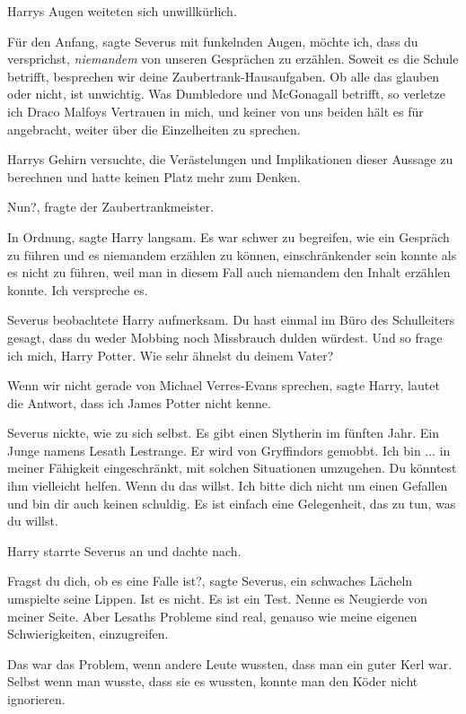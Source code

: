 Harrys Augen weiteten sich unwillkürlich.

\glqq{}Für den Anfang\grqq{}, sagte Severus mit funkelnden Augen, \glqq{}möchte
ich, dass du versprichst, \emph{niemandem} von unseren Gesprächen zu erzählen.
Soweit es die Schule betrifft, besprechen wir deine Zaubertrank-Hausaufgaben. Ob
alle das glauben oder nicht, ist unwichtig. Was Dumbledore und McGonagall
betrifft, so verletze ich Draco Malfoys Vertrauen in mich, und keiner von uns
beiden hält es für angebracht, weiter über die Einzelheiten zu sprechen.\grqq{}

Harrys Gehirn versuchte, die Verästelungen und Implikationen dieser Aussage zu
berechnen und hatte keinen Platz mehr zum Denken.

\glqq{}Nun?\grqq{}, fragte der Zaubertrankmeister.

\glqq{}In Ordnung\grqq{}, sagte Harry langsam. Es war schwer zu begreifen, wie
ein Gespräch zu führen und es niemandem erzählen zu können, einschränkender sein
konnte als es nicht zu führen, weil man in diesem Fall auch niemandem den Inhalt
erzählen konnte. \glqq{}Ich verspreche es.\grqq{}

Severus beobachtete Harry aufmerksam. \glqq{}Du hast einmal im Büro des
Schulleiters gesagt, dass du weder Mobbing noch Missbrauch dulden würdest. Und
so frage ich mich, Harry Potter. Wie sehr ähnelst du deinem Vater?\grqq{}

\glqq{}Wenn wir nicht gerade von Michael Verres-Evans sprechen\grqq{}, sagte
Harry, \glqq{}lautet die Antwort, dass ich James Potter nicht kenne.\grqq{}

Severus nickte, wie zu sich selbst. \glqq{}Es gibt einen Slytherin im fünften
Jahr. Ein Junge namens Lesath Lestrange. Er wird von Gryffindors gemobbt. Ich
bin ... in meiner Fähigkeit eingeschränkt, mit solchen Situationen umzugehen. Du
könntest ihm vielleicht helfen. Wenn du das willst. Ich bitte dich nicht um
einen Gefallen und bin dir auch keinen schuldig. Es ist einfach eine
Gelegenheit, das zu tun, was du willst.\grqq{}

Harry starrte Severus an und dachte nach.

\glqq{}Fragst du dich, ob es eine Falle ist?\grqq{}, sagte Severus, ein
schwaches Lächeln umspielte seine Lippen. \glqq{}Ist es nicht. Es ist ein Test.
Nenne es Neugierde von meiner Seite. Aber Lesaths Probleme sind real, genauso
wie meine eigenen Schwierigkeiten, einzugreifen.\grqq{}

Das war das Problem, wenn andere Leute wussten, dass man ein guter Kerl war.
Selbst wenn man wusste, dass sie es wussten, konnte man den Köder nicht
ignorieren.

